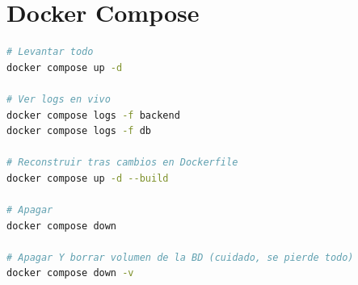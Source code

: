 \documentclass[11pt,a4paper]{book}
\begin{document}
\section{Docker Compose}

\begin{lstlisting}[language=bash]
# Levantar todo
docker compose up -d

# Ver logs en vivo
docker compose logs -f backend
docker compose logs -f db

# Reconstruir tras cambios en Dockerfile
docker compose up -d --build

# Apagar
docker compose down

# Apagar Y borrar volumen de la BD (cuidado, se pierde todo)
docker compose down -v
\end{lstlisting}


\backmatter
\end{document}
